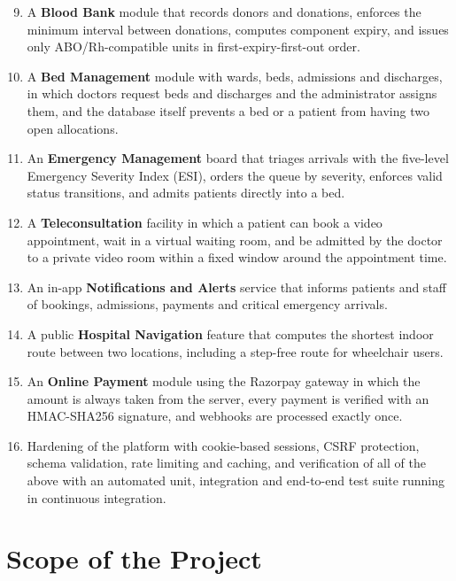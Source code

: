 \begin{enumerate}
    \setcounter{enumi}{8}
    \item A \textbf{Blood Bank} module that records donors and donations, enforces the minimum interval between donations, computes component expiry, and issues only ABO/Rh-compatible units in first-expiry-first-out order.
    \item A \textbf{Bed Management} module with wards, beds, admissions and discharges, in which doctors request beds and discharges and the administrator assigns them, and the database itself prevents a bed or a patient from having two open allocations.
    \item An \textbf{Emergency Management} board that triages arrivals with the five-level Emergency Severity Index (ESI), orders the queue by severity, enforces valid status transitions, and admits patients directly into a bed.
    \item A \textbf{Teleconsultation} facility in which a patient can book a video appointment, wait in a virtual waiting room, and be admitted by the doctor to a private video room within a fixed window around the appointment time.
    \item An in-app \textbf{Notifications and Alerts} service that informs patients and staff of bookings, admissions, payments and critical emergency arrivals.
    \item A public \textbf{Hospital Navigation} feature that computes the shortest indoor route between two locations, including a step-free route for wheelchair users.
    \item An \textbf{Online Payment} module using the Razorpay gateway in which the amount is always taken from the server, every payment is verified with an HMAC-SHA256 signature, and webhooks are processed exactly once.
    \item Hardening of the platform with cookie-based sessions, CSRF protection, schema validation, rate limiting and caching, and verification of all of the above with an automated unit, integration and end-to-end test suite running in continuous integration.
\end{enumerate}

\FloatBarrier
\section{Scope of the Project}

